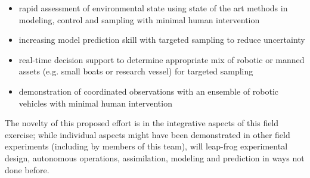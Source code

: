 \begin{itemize}

\item rapid assessment of environmental state using state of the art
  methods in modeling, control and sampling with minimal human
  intervention
  
\item increasing model prediction skill with targeted sampling to reduce
  uncertainty
  
\item real-time decision support to determine appropriate mix of robotic
  or manned assets (e.g. small boats or research vessel) for targeted
  sampling
  
\item demonstration of coordinated observations with an ensemble of
  robotic vehicles with minimal human intervention

\end{itemize}  

The novelty of this proposed effort is in the integrative aspects of
this field exercise; while individual aspects might have been
demonstrated in other field experiments (including by members of this
team), \proj will leap-frog experimental design, autonomous
operations, assimilation, modeling and prediction in ways not done
before.

